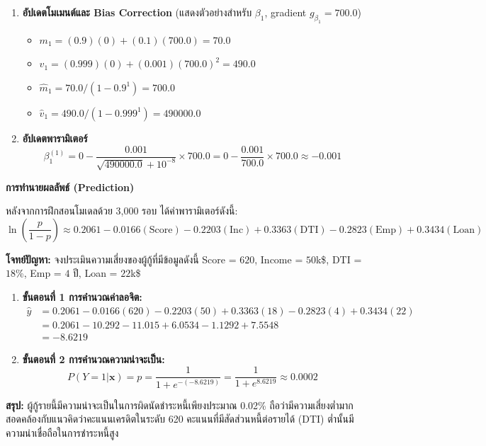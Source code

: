 \begin{enumerate}
    \item \textbf{อัปเดตโมเมนต์และ Bias Correction} (แสดงตัวอย่างสำหรับ $\beta_1$, gradient $g_{\beta_1} = 700.0$)
    \begin{itemize}
        \item $m_1 = (0.9)(0) + (0.1)(700.0) = 70.0$
        \item $v_1 = (0.999)(0) + (0.001)(700.0)^2 = 490.0$
        \item $\hat{m}_1 = 70.0 / (1 - 0.9^1) = 700.0$
        \item $\hat{v}_1 = 490.0 / (1 - 0.999^1) = 490000.0$
    \end{itemize}

    \item \textbf{อัปเดตพารามิเตอร์}
    $$\beta_1^{(1)} = 0 - \frac{0.001}{\sqrt{490000.0} + 10^{-8}} \times 700.0 = 0 - \frac{0.001}{700.0} \times 700.0 \approx -0.001$$
\end{enumerate}

\noindent
\textbf{การทำนายผลลัพธ์ (Prediction)}

หลังจากการฝึกสอนโมเดลด้วย 3,000 รอบ ได้ค่าพารามิเตอร์ดังนี้:
$$\ln \left( \frac{p}{1-p} \right) \approx 0.2061 - 0.0166(\text{Score}) - 0.2203(\text{Inc}) + 0.3363(\text{DTI}) - 0.2823(\text{Emp}) + 0.3434(\text{Loan})$$

\noindent
\textbf{โจทย์ปัญหา:} จงประเมินความเสี่ยงของผู้กู้ที่มีข้อมูลดังนี้ Score = $620$, Income = $50$k\$, DTI = $18$\%, Emp = $4$ ปี, Loan = $22$k\$

\begin{enumerate}
    \item \textbf{ขั้นตอนที่ 1 การคำนวณค่าลอจิต:}
    \begin{align*}
        \hat{y} &= 0.2061 - 0.0166(620) - 0.2203(50) + 0.3363(18) - 0.2823(4) + 0.3434(22) \\
                &= 0.2061 - 10.292 - 11.015 + 6.0534 - 1.1292 + 7.5548 \\
                &= -8.6219
    \end{align*}

    \item \textbf{ขั้นตอนที่ 2 การคำนวณความน่าจะเป็น:}
    $$P(Y=1 | \mathbf{x}) = p = \frac{1}{1 + e^{-(-8.6219)}} = \frac{1}{1 + e^{8.6219}} \approx 0.0002$$
\end{enumerate}

\noindent
\textbf{สรุป:} ผู้กู้รายนี้มีความน่าจะเป็นในการผิดนัดชำระหนี้เพียงประมาณ 0.02\% ถือว่ามีความเสี่ยงต่ำมาก สอดคล้องกับแนวคิดว่าคะแนนเครดิตในระดับ 620 คะแนนที่มีสัดส่วนหนี้ต่อรายได้ (DTI) ต่ำนั้นมีความน่าเชื่อถือในการชำระหนี้สูง

